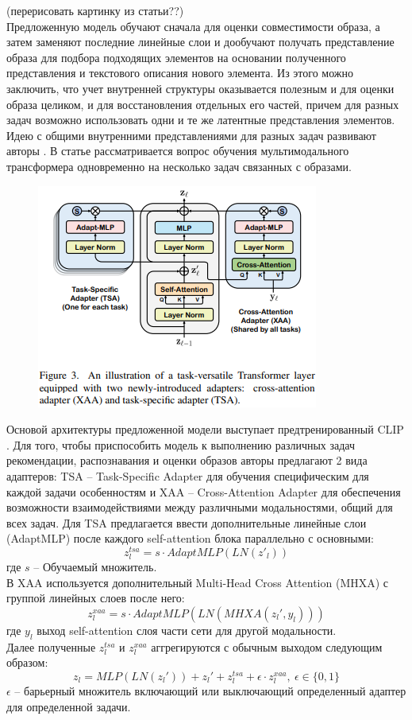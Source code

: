\documentclass[a4paper,12pt]{article}
\begin{document}
								
				(перерисовать картинку из статьи??)\\
				
				Предложенную модель обучают сначала для оценки совместимости образа, а затем заменяют последние линейные слои и дообучают получать представление образа для подбора подходящих элементов на основании полученного представления и текстового описания нового элемента. Из этого можно заключить, что учет внутренней структуры оказывается полезным и для оценки образа целиком, и для восстановления отдельных его частей, причем для разных задач возможно использовать одни и те же латентные представления элементов. \\
				
				Идею с общими внутренними представлениями для разных задач развивают авторы \cite{https://doi.org/10.48550/arXiv.2303.02483}. В статье рассматривается вопрос обучения мультимодального трансформера одновременно на несколько задач связанных с образами. 
				\newpage
				
				\begin{figure}
					\includegraphics[scale = 1.0]{FAME-ViL_acrhitecture.png}
				\end{figure}
				
				Основой архитектуры предложенной модели выступает предтренированный CLIP \cite{https://doi.org/10.48550/arXiv.2103.00020}. Для того, чтобы приспособить модель к выполнению различных задач рекомендации, распознавания и оценки образов авторы предлагают 2 вида адаптеров: TSA -- Task-Specific Adapter для обучения специфическим для каждой задачи особенностям и XAA -- Cross-Attention Adapter для обеспечения возможности взаимодействиями между различными модальностями, общий для всех задач. Для TSA предлагается ввести дополнительные линейные слои (AdaptMLP) после каждого self-attention блока параллельно с основными:
				$$z_l^{tsa}=s \cdot AdaptMLP(LN(z'_l))$$
				где $s$ -- Обучаемый множитель.\\
				В XAA используется дополнительный Multi-Head Cross Attention (MHXA) с группой линейных слоев после него:
				$$z_l^{xaa} = s\cdot AdaptMLP(LN(MHXA(z_l',y_l)))$$
				где $y_l$ выход self-attention слоя части сети для другой модальности.\\
				Далее полученные $z_l^{tsa}$ и $z_l^{xaa}$ аггрегируются с обычным выходом следующим образом:
				$$z_l = MLP(LN(z_l')) + z_l'+z_l^{tsa}+\epsilon\cdot z_l^{xaa},~\epsilon\in\{0,1\}$$
				$\epsilon$ -- барьерный множитель включающий или выключающий определенный адаптер для определенной задачи. 
				
\end{document}
